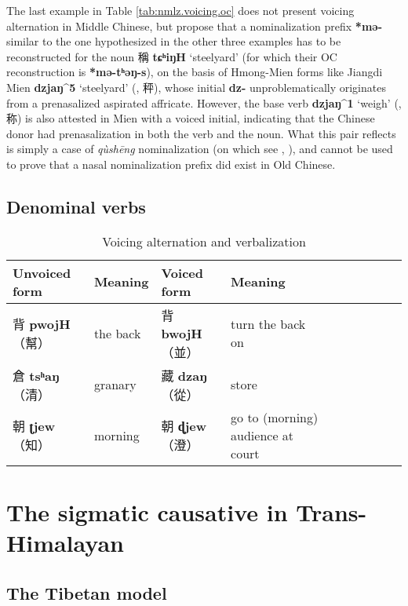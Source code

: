 \documentclass[oneside,a4paper,11pt]{article}
\newcommand{\ipa}[1]{\textbf{{\phon\mbox{#1}}}} %
\newcommand{\zh}[1]{{\cn #1}}
\newcommand{\zhc}[2]{\zh{#1} \ipa{#2}}
\newcommand{\mc}[1]{\zh{（#1）}}
\begin{document}
The last example in Table \ref{tab:nmlz.voicing.oc} does not present voicing alternation in Middle Chinese, but \citet{bs14oc} propose that a nominalization prefix \ipa{*mə-} similar to the one hypothesized in the other three examples has to be reconstructed for the noun \zhc{稱}{tɕʰiŋH} `steelyard' (for which their OC reconstruction is \ipa{*mə-tʰəŋ-s}), on the basis of Hmong-Mien forms like Jiangdi Mien \ipa{dzjaŋ^5} `steelyard' (\citealt[68]{maozw92mien}, \zh{秤}), whose initial \ipa{dz-} unproblematically originates from a prenasalized aspirated affricate. However, the base verb \ipa{dzjaŋ^1} `weigh' (\citealt[167]{maozw92mien}, \zh{称}) is also attested in Mien with a voiced initial, indicating that the Chinese donor had prenasalization in both the verb and the noun. What this pair reflects is simply a case of \textit{qùshēng} nominalization (on which see \citealt{downer59}, \citealt{jacques16ssuffixes}), and cannot be used to prove that a nasal nominalization prefix did exist in Old Chinese.


\subsection{Denominal verbs}
\citet[55]{bs14oc}



\begin{table}[H]
\caption{Voicing alternation and verbalization}
\begin{tabular}{llllllllll}
\toprule
Unvoiced form &Meaning & Voiced form & Meaning\\
\midrule
\zhc{背}{pwojH} \mc{幫}	&the back& \zhc{背}{bwojH} \mc{並} & turn the back on \\
\zhc{倉}{tsʰaŋ} \mc{清}	&granary & \zhc{藏}{dzaŋ} \mc{從} & store \\
\zhc{朝}{ʈjew} \mc{知}	&morning  & \zhc{朝}{ɖjew} \mc{澄} & go to (morning) audience at court \\
\bottomrule
\end{tabular}
\end{table}


\section{The sigmatic causative in Trans-Himalayan}

\subsection{The Tibetan model}
\end{document}
